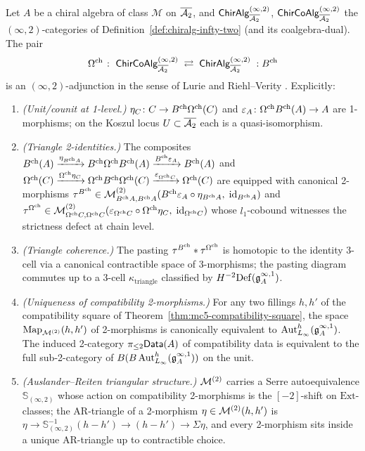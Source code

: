 \begin{theorem}
\label{thm:mc5-infty-two-adjunction}
\ClaimStatusConditional%
%
%
Let $A$ be a chiral algebra of class $\mathcal M$ on $\overline{\mathcal{A}_2}$, and
$\mathsf{ChirAlg}^{(\infty,2)}_{\overline{\mathcal{A}_2}}$,
$\mathsf{ChirCoAlg}^{(\infty,2)}_{\overline{\mathcal{A}_2}}$ the $(\infty,2)$-categories of
Definition~\textup{\ref{def:chiralg-infty-two}} (and its
coalgebra-dual). The pair
\[
\Omega^{\mathrm{ch}}\;\colon\;\mathsf{ChirCoAlg}^{(\infty,2)}_{\overline{\mathcal{A}_2}}\;\rightleftarrows\;
\mathsf{ChirAlg}^{(\infty,2)}_{\overline{\mathcal{A}_2}}\;\;{:}\;B^{\mathrm{ch}}
\]
is an $(\infty,2)$-adjunction in the sense of Lurie
\cite[.2]{LurieHA} and Riehl--Verity
\cite[]{RiehlVerity2022elements}. Explicitly:
\begin{enumerate}
\item \emph{(Unit/counit at 1-level.)}
$\eta_C\colon C\to B^{\mathrm{ch}}\Omega^{\mathrm{ch}}(C)$ and $\varepsilon_A\colon\Omega^{\mathrm{ch}}B^{\mathrm{ch}}(A)\to A$
are 1-morphisms; on the Koszul locus $U\subset\overline{\mathcal{A}_2}$ each is a
quasi-isomorphism.
\item \emph{(Triangle 2-identities.)} The composites
$B^{\mathrm{ch}}(A)\xrightarrow{\eta_{B^{\mathrm{ch}} A}}B^{\mathrm{ch}}\Omega^{\mathrm{ch}}B^{\mathrm{ch}}(A)
\xrightarrow{B^{\mathrm{ch}}\varepsilon_A}B^{\mathrm{ch}}(A)$ and
$\Omega^{\mathrm{ch}}(C)\xrightarrow{\Omega^{\mathrm{ch}}\eta_C}\Omega^{\mathrm{ch}}B^{\mathrm{ch}}\Omega^{\mathrm{ch}}(C)
\xrightarrow{\varepsilon_{\Omega^{\mathrm{ch}} C}}\Omega^{\mathrm{ch}}(C)$ are equipped with canonical
2-morphisms
$\tau^{B^{\mathrm{ch}}}\in\mathcal{M}^{(2)}_{B^{\mathrm{ch}} A,B^{\mathrm{ch}} A}(B^{\mathrm{ch}}\varepsilon_A\circ\eta_{B^{\mathrm{ch}} A},\;
\mathrm{id}_{B^{\mathrm{ch}} A})$ and
$\tau^{\Omega^{\mathrm{ch}}}\in\mathcal{M}^{(2)}_{\Omega^{\mathrm{ch}} C,\Omega^{\mathrm{ch}} C}(\varepsilon_{\Omega^{\mathrm{ch}} C}\circ\Omega^{\mathrm{ch}}\eta_C,\;
\mathrm{id}_{\Omega^{\mathrm{ch}} C})$ whose $l_1$-cobound witnesses the strictness
defect at chain level.
\item \emph{(Triangle coherence.)} The pasting
$\tau^{B^{\mathrm{ch}}}*\tau^{\Omega^{\mathrm{ch}}}$ is homotopic to the identity 3-cell via a
canonical contractible space of 3-morphisms; the pasting diagram
commutes up to a 3-cell $\kappa_{\mathrm{triangle}}$ classified by
$H^{-2}\mathrm{Def}(\mathfrak{g}^{\infty,1}_A)$.
\item \emph{(Uniqueness of compatibility 2-morphisms.)} For any two
fillings $h,h'$ of the compatibility square of
Theorem~\textup{\ref{thm:mc5-compatibility-square}}, the space
$\mathrm{Map}_{\mathcal{M}^{(2)}}(h,h')$ of 2-morphisms is canonically
equivalent to $\operatorname{Aut}^h_{L_\infty}(\mathfrak{g}^{\infty,1}_A)$. The
induced 2-category $\pi_{\le 2}\mathsf{Data}(A)$ of compatibility data is
equivalent to the full sub-2-category of
$B(B\operatorname{Aut}^h_{L_\infty}(\mathfrak{g}^{\infty,1}_A))$ on the unit.
\item \emph{(Auslander--Reiten triangular structure.)} $\mathcal{M}^{(2)}$
carries a Serre autoequivalence $\mathbb{S}_{(\infty,2)}$ whose
action on compatibility 2-morphisms is the $[-2]$-shift on
$\mathrm{Ext}$-classes; the AR-triangle of a 2-morphism
$\eta\in\mathcal{M}^{(2)}(h,h')$ is
$\eta\to\mathbb{S}_{(\infty,2)}^{-1}(h-h')\to(h-h')\to\Sigma\eta$, and
every 2-morphism sits inside a unique AR-triangle up to contractible
choice.
\end{enumerate}
\end{theorem}

